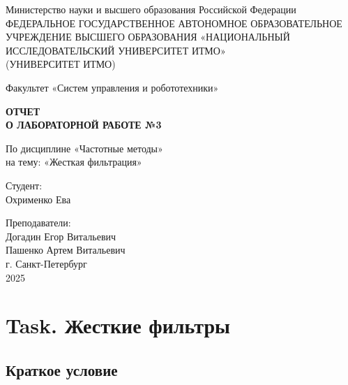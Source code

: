\documentclass[a4paper,12pt]{article}
\begin{document}
\begin{titlepage}
    \centering
    \vspace*{1cm}

    {\large Министерство науки и высшего образования Российской Федерации}\\
    {\large ФЕДЕРАЛЬНОЕ ГОСУДАРСТВЕННОЕ АВТОНОМНОЕ ОБРАЗОВАТЕЛЬНОЕ УЧРЕЖДЕНИЕ ВЫСШЕГО ОБРАЗОВАНИЯ «НАЦИОНАЛЬНЫЙ ИССЛЕДОВАТЕЛЬСКИЙ УНИВЕРСИТЕТ ИТМО»}\\
    {\large (УНИВЕРСИТЕТ ИТМО)}\\

    \vspace{2cm}

    {\large Факультет «Систем управления и робототехники»}\\

    \vspace{3cm}

    \textbf{{\Huge ОТЧЕТ}\\
    {\Huge О ЛАБОРАТОРНОЙ РАБОТЕ №3}}\\

    \vspace{1cm}

    {\LARGE По дисциплине «Частотные методы»}\\
    {\LARGE на тему: «Жесткая фильтрация»}\\

    \vspace{3cm}

    {\Large Студент:}\\
    Охрименко Ева

    \vspace{2cm}

    {\Large Преподаватели:}\\
    Догадин Егор Витальевич\\
    Пашенко Артем Витальевич\\

    \vspace{3cm}
    {\large г. Санкт-Петербург}\\
    {\large 2025}

\end{titlepage}
\newpage
\tableofcontents
\newpage

\section{Task. Жесткие фильтры}
\subsection{Краткое условие}
\end{document}
